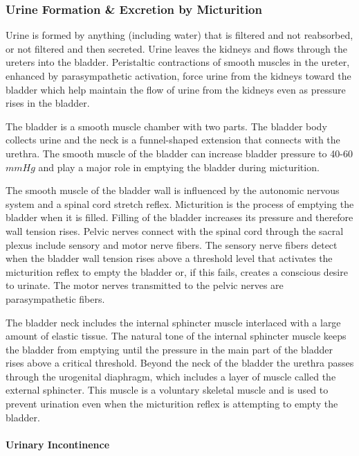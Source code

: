 \subsubsection{Urine Formation \& Excretion by Micturition}

Urine is formed by anything (including water) that is filtered and not reabsorbed, or not filtered and then secreted. Urine leaves the kidneys and flows through the ureters into the bladder. Peristaltic contractions of smooth muscles in the ureter, enhanced by parasympathetic activation, force urine from the kidneys toward the bladder which help maintain the flow of urine from the kidneys even as pressure rises in the bladder. 

The bladder is a smooth muscle chamber with two parts. The bladder body collects urine and the neck is a funnel-shaped extension that connects with the urethra. The smooth muscle of the bladder can increase bladder pressure to 40-60 $mm Hg$ and play a major role in emptying the bladder during micturition.

The smooth muscle of the bladder wall is influenced by the autonomic nervous system and a spinal cord stretch reflex. Micturition is the process of emptying the bladder when it is filled. Filling of the bladder increases its pressure and therefore wall tension rises. Pelvic nerves connect with the spinal cord through the sacral plexus include sensory and motor nerve fibers. The sensory nerve fibers detect when the bladder wall tension rises above a threshold level that activates the micturition reflex to empty the bladder or, if this fails, creates a conscious desire to urinate. The motor nerves transmitted to the pelvic nerves are parasympathetic fibers.

The bladder neck includes the internal sphincter muscle interlaced with a large amount of elastic tissue. The natural tone of the internal sphincter muscle keeps the bladder from emptying until the pressure in the main part of the bladder rises above a critical threshold. Beyond the neck of the bladder the urethra passes through the urogenital diaphragm, which includes a layer of muscle called the external sphincter. This muscle is a voluntary skeletal muscle and is used to prevent urination even when the micturition reflex is attempting to empty the bladder.

\paragraph{Urinary Incontinence}

